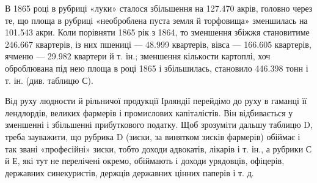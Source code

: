 \setlength{\tabcolsep}{\tabcolsepdef}

В 1865 році в рубриці «луки» сталося збільшення на 127.470 акрів,
головно через те, що площа в рубриці «необроблена пуста
земля й торфовища» зменшилась на 101.543 акри. Коли порівняти
1865 рік з 1864, то зменшення збіжжя становитиме 246.667
квартерів, із них пшениці — 48.999 квартерів, вівса — 166.605 квартерів,
ячменю — 29.982 квартери й т. ін.; зменшення кількости
картоплі, хоч оброблювана під нею площа в році 1865 і збільшилась,
становило 446.398 тонн і т. ін. (див. таблицю С).

Від руху людности й рільничої продукції Ірляндії перейдімо
до руху в гаманці її лендлордів, великих фармерів і промислових
капіталістів. Він відбивається у зменшенні і збільшенні прибуткового
податку. Щоб зрозуміти дальшу таблицю D, треба зауважити,
що рубрика D (зиски, за винятком зисків фармерів) обіймає
і так звані «професійні» зиски, тобто доходи адвокатів,
лікарів і т. ін., а рубрики С й Е, які тут не перелічені окремо,
обіймають і доходи урядовців, офіцерів, державних синекуристів,
держців державних цінних паперів і т. д.
